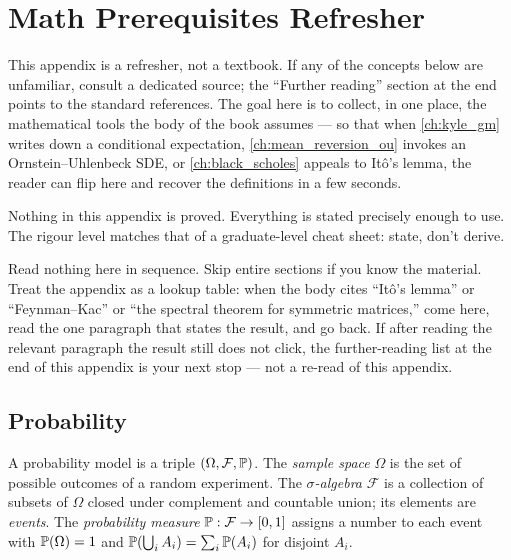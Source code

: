\chapter{Math Prerequisites Refresher}
\label{ch:app_math}

This appendix is a refresher, not a textbook. If any of the concepts
below are unfamiliar, consult a dedicated source; the ``Further reading''
section at the end points to the standard references. The goal here is
to collect, in one place, the mathematical tools the body of the book
assumes --- so that when \cref{ch:kyle_gm} writes down a conditional
expectation, \cref{ch:mean_reversion_ou} invokes an Ornstein--Uhlenbeck
SDE, or \cref{ch:black_scholes} appeals to It\^o's lemma, the reader can
flip here and recover the definitions in a few seconds.

Nothing in this appendix is proved. Everything is stated precisely
enough to use. The rigour level matches that of a graduate-level
cheat sheet: state, don't derive.

\begin{backgroundbox}
Read nothing here in sequence. Skip entire sections if you know the
material. Treat the appendix as a lookup table: when the body cites
``It\^o's lemma'' or ``Feynman--Kac'' or ``the spectral theorem for
symmetric matrices,'' come here, read the one paragraph that states the
result, and go back. If after reading the relevant paragraph the result
still does not click, the further-reading list at the end of this
appendix is your next stop --- not a re-read of this appendix.
\end{backgroundbox}

\section{Probability}
\label{sec:app_math_prob}

A probability model is a triple $(\Omega, \mathcal{F}, \mathbb{P})$. The
\emph{sample space} $\Omega$ is the set of possible outcomes of a random
experiment. The \emph{$\sigma$-algebra} $\mathcal{F}$ is a collection
of subsets of $\Omega$ closed under complement and countable union; its
elements are \emph{events}. The \emph{probability measure}
$\mathbb{P} : \mathcal{F} \to [0,1]$ assigns a number to each event with
$\mathbb{P}(\Omega) = 1$ and $\mathbb{P}(\bigcup_i A_i) = \sum_i \mathbb{P}(A_i)$ for
disjoint $A_i$.

